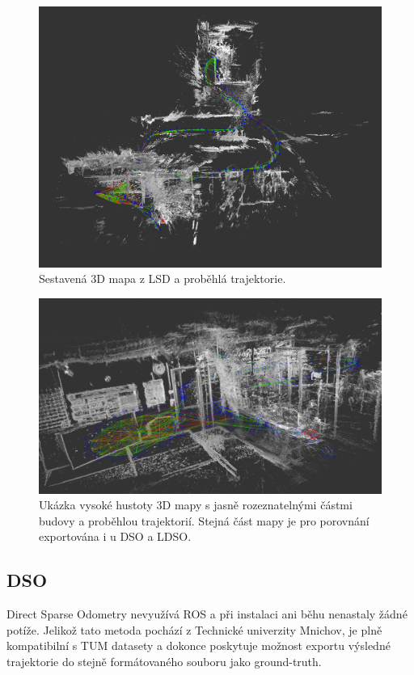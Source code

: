 \documentclass[12pt,a4paper]{report}
\begin{document}
\begin{figure}[H]
\centering
\includegraphics[scale=0.455]{img/LSD_11_top.png}
\caption{Sestavená 3D mapa z LSD a proběhlá trajektorie.}
\end{figure} 

\begin{figure}[H]
\centering
\includegraphics[scale=0.31]{img/LSD_11_kancl.png}
\caption{Ukázka vysoké hustoty 3D mapy s jasně rozeznatelnými částmi budovy a proběhlou trajektorií. Stejná část mapy je pro porovnání exportována i u DSO a LDSO.}
\end{figure} 

\subsection{DSO}
Direct Sparse Odometry nevyužívá ROS a při instalaci ani běhu nenastaly žádné potíže. Jelikož tato metoda pochází z Technické univerzity Mnichov, je plně kompatibilní s TUM datasety a dokonce poskytuje možnost exportu výsledné trajektorie do stejně formáto\-vaného souboru jako ground-truth.
\end{document}

